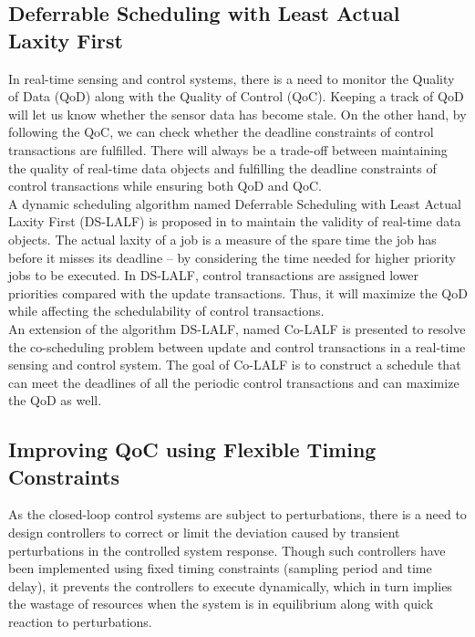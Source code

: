 \documentclass[12pt]{report}
\begin{document}
\subsection{Deferrable Scheduling with Least Actual Laxity First}
In real-time sensing and control systems, there is a need to monitor the Quality of Data (QoD) along with the Quality of Control (QoC). Keeping a track of QoD will let us know whether the sensor data has become stale. On the other hand, by following the QoC, we can check whether the deadline constraints of control transactions are fulfilled. There will always be a trade-off between maintaining the quality of real-time data objects and fulfilling the deadline constraints of control transactions while ensuring both QoD and QoC.\\

A dynamic scheduling algorithm named Deferrable Scheduling with Least Actual Laxity First (DS-LALF) is proposed in \cite{ds-lalf} to maintain the validity of real-time data objects. The actual laxity of a job is a measure of the spare time the job has before it misses its deadline -- by considering the time needed for higher priority jobs to be executed. In DS-LALF, control transactions are assigned lower priorities compared with the update transactions. Thus, it will maximize the QoD while affecting the schedulability of control transactions. \\     

An extension of the algorithm DS-LALF, named Co-LALF is presented to resolve the co-scheduling problem between update and control transactions in a real-time sensing and control system. The goal of Co-LALF is to construct a schedule that can meet the deadlines of all the periodic control transactions and can maximize the QoD as well. 

\subsection{Improving QoC using Flexible Timing Constraints}
As the closed-loop control systems are subject to perturbations, there is a need to design controllers to correct or limit the deviation caused by transient perturbations in the controlled system response. Though such controllers have been implemented using fixed timing constraints (sampling period and time delay), it prevents the controllers to execute dynamically, which in turn implies the wastage of resources when the system is in equilibrium along with quick reaction to perturbations. \\ 
\end{document}
